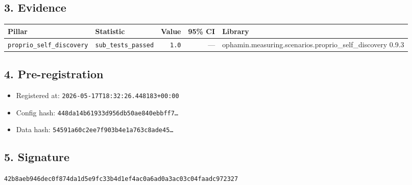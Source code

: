 \documentclass{article}
\begin{document}
\subsection*{3. Evidence}
\begin{tabular}{llrrl}\toprule
\textbf{Pillar} & \textbf{Statistic} & \textbf{Value} & \textbf{95\% CI} & \textbf{Library} \\\midrule
\texttt{proprio\_self\_discovery} & \texttt{sub\_tests\_passed} & \texttt{1.0} & --- & ophamin.measuring.scenarios.proprio\_self\_discovery 0.9.3 \\
\bottomrule\end{tabular}
\subsection*{4. Pre-registration}
\begin{itemize}
\item Registered at: \texttt{2026-05-17T18:32:26.448183+00:00}
\item Config hash: \texttt{448da14b61933d956db50ae840ebbff7\dots}
\item Data hash: \texttt{54591a60c2ee7f903b4e1a763c8ade45\dots}
\end{itemize}
\subsection*{5. Signature}
\texttt{42b8aeb946dec0f874da1d5e9fc33b4d1ef4ac0a6ad0a3ac03c04faadc972327}\\
\end{document}
